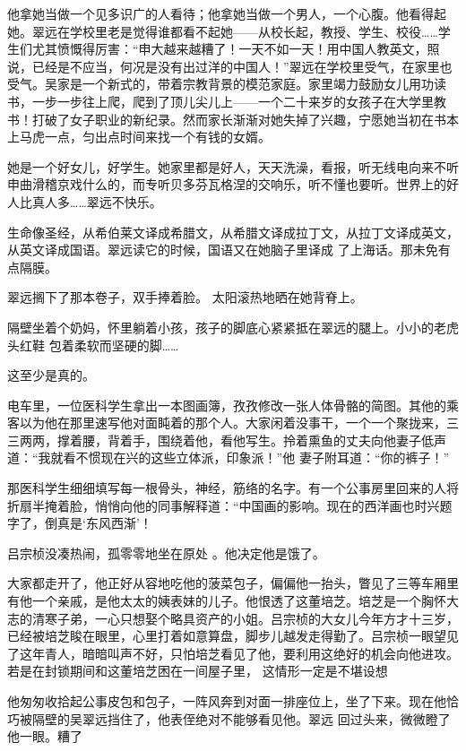 \documentclass{article}
\begin{document}
    他拿她当做一个见多识广的人看待；他拿她当做一个男人，一个心腹。他看得起她。翠远在学校里老是觉得谁都看不起她——从校长起，教授、学生、校役……学生们尤其愤慨得厉害：“申大越来越糟了！一天不如一天！用中国人教英文，照说，已经是不应当，何况是没有出过洋的中国人！”翠远在学校里受气，在家里也受气。吴家是一个新式的，带着宗教背景的模范家庭。家里竭力鼓励女儿用功读书，一步一步往上爬，爬到了顶儿尖儿上——一个二十来岁的女孩子在大学里教书！打破了女子职业的新纪录。然而家长渐渐对她失掉了兴趣，宁愿她当初在书本上马虎一点，匀出点时间来找一个有钱的女婿。
\newpage

 

    她是一个好女儿，好学生。她家里都是好人，天天洗澡，看报，听无线电向来不听申曲滑稽京戏什么的，而专听贝多芬瓦格涅的交响乐，听不懂也要听。世界上的好人比真人多……翠远不快乐。

    生命像圣经，从希伯莱文译成希腊文，从希腊文译成拉丁文，从拉丁文译成英文，从英文译成国语。翠远读它的时候，国语又在她脑子里译成
了上海话。那未免有点隔膜。 

    翠远搁下了那本卷子，双手捧着脸。
太阳滚热地晒在她背脊上。 

    隔壁坐着个奶妈，怀里躺着小孩，孩子的脚底心紧紧抵在翠远的腿上。小小的老虎头红鞋
包着柔软而坚硬的脚…… 


    这至少是真的。 

\newpage

    电车里，一位医科学生拿出一本图画簿，孜孜修改一张人体骨骼的简图。其他的乘客以为他在那里速写他对面盹着的那个人。大家闲着没事干，一个一个聚拢来，三三两两，撑着腰，背着手，围绕着他，看他写生。拎着熏鱼的丈夫向他妻子低声道：“我就看不惯现在兴的这些立体派，印象派！”他
妻子附耳道：“你的裤子！” 

    那医科学生细细填写每一根骨头，神经，筋络的名字。有一个公事房里回来的人将折扇半掩着脸，悄悄向他的同事解释道：“中国画的影响。现在的西洋画也时兴题字了，倒真是‘东风西渐’！

    吕宗桢没凑热闹，孤零零地坐在原处
。他决定他是饿了。 

    大家都走开了，他正好从容地吃他的菠菜包子，偏偏他一抬头，瞥见了三等车厢里有他一个亲戚，是他太太的姨表妹的儿子。他恨透了这董培芝。培芝是一个胸怀大志的清寒子弟，一心只想娶个略具资产的小姐。吕宗桢的大女儿今年方才十三岁，
\newpage
已经被培芝睃在眼里，心里打着如意算盘，脚步儿越发走得勤了。吕宗桢一眼望见了这年青人，暗暗叫声不好，只怕培芝看见了他，要利用这绝好的机会向他进攻。若是在封锁期间和这董培芝困在一间屋子里，
这情形一定是不堪设想 

    他匆匆收拾起公事皮包和包子，一阵风奔到对面一排座位上，坐了下来。现在他恰巧被隔壁的吴翠远挡住了，他表侄绝对不能够看见他。翠远
回过头来，微微瞪了他一眼。糟了 
\end{document}
